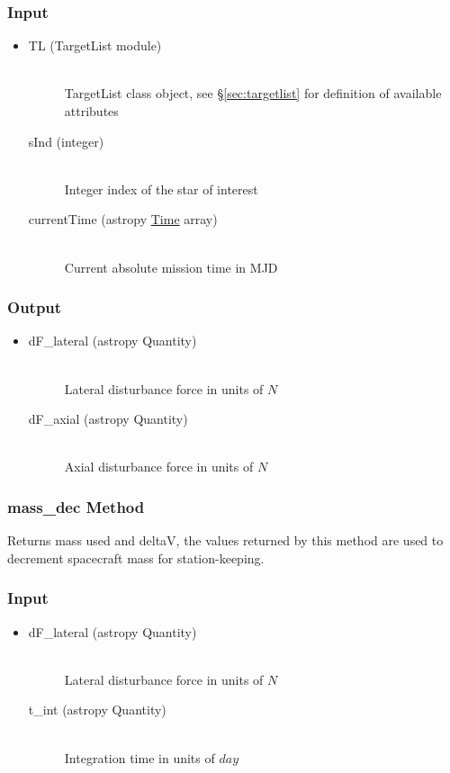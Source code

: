 \documentclass[cleanfoot]{asme2ej}
\begin{document}
\subsubsection*{Input}
\begin{itemize}
\item
\begin{description}
    \item[TL (TargetList module)] \hfill \\ TargetList class object, see \S\ref{sec:targetlist} for definition of available attributes
    \item[sInd (integer)] \hfill \\ Integer index of the star of interest
    \item[currentTime (astropy \href{http://astropy.readthedocs.org/en/latest/time/index.html}{Time} array)] \hfill \\ Current absolute mission time in MJD
\end{description}
\end{itemize}
\subsubsection*{Output}
\begin{itemize}
\item 
\begin{description}
    \item[dF\_lateral (astropy Quantity)] \hfill \\ Lateral disturbance force in units of $N$
    \item[dF\_axial (astropy Quantity)] \hfill \\ Axial disturbance force in units of $N$
\end{description}
\end{itemize}

\subsubsection{mass\_dec Method} \label{}
Returns mass used and deltaV, the values returned by this method are used to decrement spacecraft mass for station-keeping.
\subsubsection*{Input}
\begin{itemize}
\item
\begin{description}
    \item[dF\_lateral (astropy Quantity)] \hfill \\ Lateral disturbance force in units of $N$
    \item[t\_int (astropy Quantity)] \hfill \\ Integration time in units of $day$
\end{description}
\end{itemize}
\end{document}
